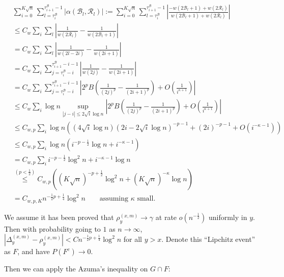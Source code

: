 \begin{align*}
	&\sum_{i = 0}^{K \sqrt{n} } 
	\sum_{l = \tau_i^{\mathcal{B}}} ^{\tau_{i+1}^{\mathcal{B}}  -1}
	|\alpha(\mathcal{B}_l, \mathcal{R}_l)|
	:=
	\sum_{i = 0}^{K \sqrt{n} } 
	\sum_{l = \tau_i^{\mathcal{B}}} ^{\tau_{i+1}^{\mathcal{B}}  -1}
	\left|\frac{-w(2 \mathcal{B}_l + 1) + w(2 \mathcal{R}_l)}{w(2\mathcal{B}_l + 1) + w(2 \mathcal{R}_l)}\right|\\
	&\le C_w \sum_i \sum_l \left| \frac{1}{w(2 \mathcal{R}_l)} - \frac{1}{w(2 \mathcal{B}_l + 1)} \right|  \\
	&= C_w \sum_i \sum_l \left| \frac{1}{w(2 l - 2 i)} - \frac{1}{w(2i + 1)} \right|  \\
	&= C_w \sum_i \sum_{j = \tau_i^{\mathcal{B}} - i}^{\tau_{i+1}^{\mathcal{B}} - i - 1} \left| \frac{1}{w(2j)} - \frac{1}{w(2i + 1)} \right|  \\
	&= C_w \sum_i \sum_{j = \tau_i^{\mathcal{B}} - i}^{\tau_{i+1}^{\mathcal{B}} - i - 1} \left|  2^p B\left( \frac{1}{(2j)^p} - \frac{1}{(2i + 1)^p} \right)  + O\left( \frac{1}{i^{\kappa + 1}} \right) \right|  \\
	&\le C_w \sum_i \log n \sup_{|j - i| \le 2 \sqrt{i}  \log n} \left|  2^p B\left( \frac{1}{(2j)^p} - \frac{1}{(2i + 1)^p} \right)  + O\left( \frac{1}{i^{\kappa + 1}} \right) \right| \\
	&\le C_{w, p} \sum_i \log n \left( 
		(4 \sqrt{ i } \log n) (2 i - 2 \sqrt{ i } \log n)^{- p - 1} + (2 i)^{- p - 1} + O(i^{- \kappa - 1})
	\right)  \\
	&\le C_{w, p} \sum_i \log n \left( i ^{-p - \frac{1}{2}} \log n +  i^{- \kappa - 1} \right)  \\
	&= C_{w, p} \sum_i i^{- p - \frac{1}{2}} \log^2 n + i^{- \kappa - 1 } \log n \\
	&\stackrel{(p<\frac{1}{2})}{\le } C_{w, p} \left( (K \sqrt{ n} )^{-p+ \frac{1}{2}} \log^2 n + (K \sqrt{ n} )^{- \kappa } \log n \right)  \\
	&= C_{w, p, K} n^{-\frac{1}{2}p + \frac{1}{4}  }  \log^2 n \qquad \text{assuming $\kappa$ small}
.\end{align*} 

We assume it has been proved that $\rho_y^{(x,m)} \to \gamma$ at rate $o(n^{-\frac{1}{2}})$ uniformly in $y$. Then with probability going to $1$ as $n\to \infty $, $\left| \Delta_y^{(x,m)} - \rho_y^{(x,m)} \right| < C n^{-\frac{1}{2}p + \frac{1}{4}  }  \log^2 n$ for all $y > x$. Denote this ``Lipchitz event'' as $F$, and have $P(F^c) \to 0$.

Then we can apply the Azuma's inequality on $G \cap F$:

